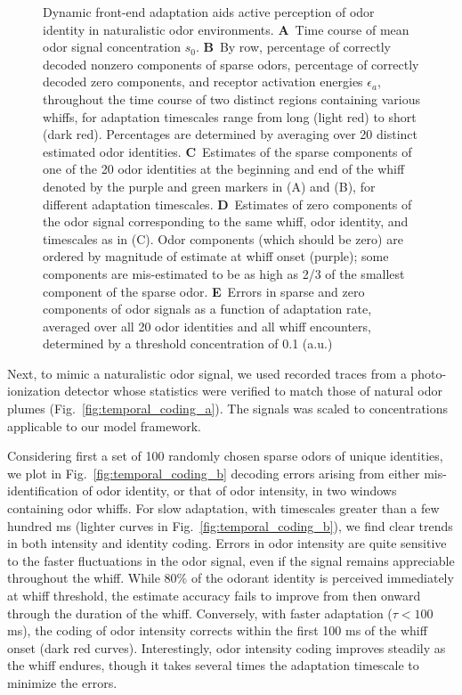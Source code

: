 \begin{figure}
	\caption{\footnotesize{Dynamic front-end adaptation aids active perception of odor identity in naturalistic odor environments. \textbf{A}~Time course of mean odor signal concentration $s_0$. \textbf{B}~By row, percentage of correctly decoded nonzero components of sparse odors, percentage of correctly decoded zero components, and receptor activation energies $\epsilon_a$, throughout the time course of two distinct regions containing various whiffs, for adaptation timescales range from long (light red) to short (dark red). Percentages are determined by averaging over 20 distinct estimated odor identities. \textbf{C}~Estimates of the sparse components of one of the 20 odor identities at the beginning and end of the whiff denoted by the purple and green markers in (A) and (B), for different adaptation timescales. \textbf{D}~Estimates of zero components of the odor signal corresponding to the same whiff, odor identity, and timescales as in (C). Odor components (which should be zero) are ordered by magnitude of estimate at whiff onset (purple); some components are mis-estimated to be as high as 2/3 of the smallest component of the sparse odor. \textbf{E}~Errors in sparse and zero components of odor signals as a function of adaptation rate, averaged over all 20 odor identities and all whiff encounters, determined by a threshold concentration of 0.1 (a.u.)}}
	\label{fig:temporal_coding}
\end{figure}

Next, to mimic a naturalistic odor signal, we used recorded traces from a photo-ionization detector whose statistics were verified to match those of natural odor plumes (Fig.~\ref{fig:temporal_coding_a}). The signals was scaled to concentrations applicable to our model framework.

Considering first a set of 100 randomly chosen sparse odors of unique identities, we plot in Fig.~\ref{fig:temporal_coding_b} decoding errors arising from either mis-identification of odor identity, or that of odor intensity, in two windows containing odor whiffs. %
For slow adaptation, with timescales greater than a few hundred ms (lighter curves in Fig.~\ref{fig:temporal_coding_b}), we find clear trends in both intensity and identity coding. Errors in odor intensity are quite sensitive to the faster fluctuations in the odor signal, even if the signal remains appreciable throughout the whiff. While 80\% of the odorant identity is perceived immediately at whiff threshold, the estimate accuracy fails to improve from then onward through the duration of the whiff. Conversely, with faster adaptation ($\tau < 100$ ms), the coding of odor intensity corrects within the first 100 ms of the whiff onset (dark red curves). Interestingly, odor intensity coding improves steadily as the whiff endures, though it takes several times the adaptation timescale to minimize the errors. 



